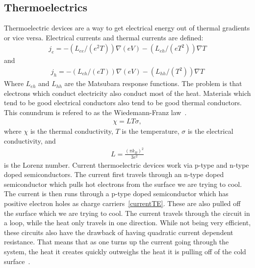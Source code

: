 \subsection{Thermoelectrics}
Thermoelectric devices are a way to get electrical energy out of thermal gradients or vice versa. Electrical currents and thermal currents are defined:
\begin{eqnarray}
j_e = -(L_{ee}/(e^2T)) \nabla (eV) - (L_{eh}/(eT^2)) \nabla T
\label{currente}
\end{eqnarray}
and
\begin{eqnarray}
j_h = -(L_{eh}/(eT)) \nabla (eV) - (L_{hh}/(T^2)) \nabla T
\label{currente}
\end{eqnarray}
Where $L_{eh}$ and $L_{hh}$ are the Matsubara response functions. The problem is that electrons which conduct electricity also conduct most of the heat. Materials which tend to be good electrical conductors also tend to be good thermal conductors. This conundrum is refered to as the Wiedemann-Franz law~\cite{glatz09}.
\begin{eqnarray}
\chi = L T \sigma ,
\label{WFlaw}
\end{eqnarray}
where $\chi$ is the thermal conductivity, $T$ is the temperature, $\sigma$ is the electrical conductivity, and 
\begin{eqnarray}
L = \frac {(\pi k_B)^2} {3e^2} 
\label{Lorenz}
\end{eqnarray}
is the Lorenz number. Current thermoelectric devices work via p-type and n-type doped semiconductors. The current first travels through an n-type doped semiconductor which pulls hot electrons from the surface we are trying to cool. The current is then runs through a p-type doped semiconductor which has positive electron holes as charge carriers~\ref{currentTE}. These are also pulled off the surface which we are trying to cool. The current travels through the circuit in a loop, while the heat only travels in one direction. While not being very efficient, these circuits also have the drawback of having quadratic current dependent resistance. That means that as one turns up the current going through the system, the heat it creates quickly outweighs the heat it is pulling off of the cold surface~\cite{Dommelen13}.  
